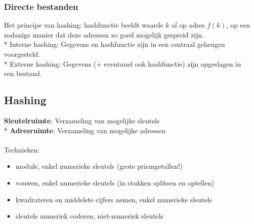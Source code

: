 \documentclass[10pt]{article}
\begin{document}
\subsubsection{Directe bestanden}
Het principe van hashing: hashfunctie beeldt waarde $k$ af op adres $f(k)$, op een zodanige manier dat deze adressen zo goed mogelijk gespreid zijn.\\*
Interne hashing: Gegevens en hashfunctie zijn in een centraal geheugen voorgesteld.\\*
Externe hashing: Gegevens (+ eventuuel ook hashfunctie) zijn opgeslagen in een bestand.
\subsection{Hashing}
\textbf{Sleutelruimte}: Verzameling van mogelijke sleutels\\*
\textbf{Adresruimte}: Verzameling van mogelijke adressen\\\\
Technieken:
\begin{itemize}
\item module, enkel numerieke sleutels (grote priemgetallen!)
\item vouwen, enkel numerieke sleutels (in stukken splitsen en optellen)
\item kwadrateren en middelste cijfers nemen, enkel numerieke sleutels
\item sleutels numeriek coderen, niet-numeriek sleutels
\end{itemize}
\end{document}

